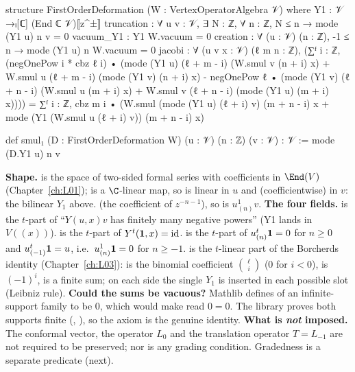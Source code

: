 \begin{leancode}
structure FirstOrderDeformation (W : VertexOperatorAlgebra 𝒱) where
  Y1 : 𝒱 →ₗ[ℂ] (End ℂ 𝒱)⟦z^±⟧
  truncation : ∀ u v : 𝒱, ∃ N : ℤ, ∀ n : ℤ, N ≤ n → mode (Y1 u) n v = 0
  vacuum_Y1 : Y1 W.vacuum = 0
  creation : ∀ (u : 𝒱) (n : ℤ), -1 ≤ n → mode (Y1 u) n W.vacuum = 0
  jacobi : ∀ (u v x : 𝒱) (ℓ m n : ℤ),
      (∑ᶠ i : ℤ, (negOnePow i * cbz ℓ i) •
          (mode (Y1 u) (ℓ + m - i) (W.smul v (n + i) x)
            + W.smul u (ℓ + m - i) (mode (Y1 v) (n + i) x)
            - negOnePow ℓ •
              (mode (Y1 v) (ℓ + n - i) (W.smul u (m + i) x)
                + W.smul v (ℓ + n - i) (mode (Y1 u) (m + i) x))))
        = ∑ᶠ i : ℤ, cbz m i •
            (W.smul (mode (Y1 u) (ℓ + i) v) (m + n - i) x
              + mode (Y1 (W.smul u (ℓ + i) v)) (m + n - i) x)
\end{leancode}
\begin{leancode}
def smul₁ (D : FirstOrderDeformation W) (u : 𝒱) (n : ℤ) (v : 𝒱) : 𝒱 := mode (D.Y1 u) n v
\end{leancode}

\begin{dictionary}
\textbf{Shape.}  is the space of two-sided formal series with coefficients in
$\End(V)$ (Chapter~\ref{ch:L01});  is a $\C$-linear map, so  is linear in
$u$ and (coefficientwise) in $v$: the bilinear $Y_1$ above.  (the
coefficient of $z^{-n-1}$), so  is $u^1_{(n)}v$.
\textbf{The four fields.}  is the $t$-part of ``$Y(u,x)v$ has finitely many
negative powers'' (Y1 lands in $V((x))$).  is the $t$-part of $Y^t(\mathbf{1},x) =
\mathrm{id}$.  is the $t$-part of $u^t_{(n)}\mathbf{1} = 0$ for $n\ge0$ and
$u^t_{(-1)}\mathbf{1} = u$, i.e.\ $u^1_{(n)}\mathbf{1} = 0$ for $n\ge-1$.  is the
$t$-linear part of the Borcherds identity (Chapter~\ref{ch:L03}):  is the binomial
coefficient $\binom{\ell}{i}$ ($0$ for $i<0$),  is $(-1)^i$,  is a finite
sum; on each side the single $Y_1$ is inserted in each possible slot (Leibniz rule).
\textbf{Could the sums be vacuous?} Mathlib defines  of an infinite-support family to be
$0$, which would make  read $0=0$. The library proves both supports finite
(, ), so the axiom is the genuine
identity. \textbf{What is \emph{not} imposed.} The conformal vector, the operator $L_0$ and the
translation operator $T = L_{-1}$ are not required to be preserved; nor is any grading condition.
Gradedness is a separate predicate (next).
\end{dictionary}

